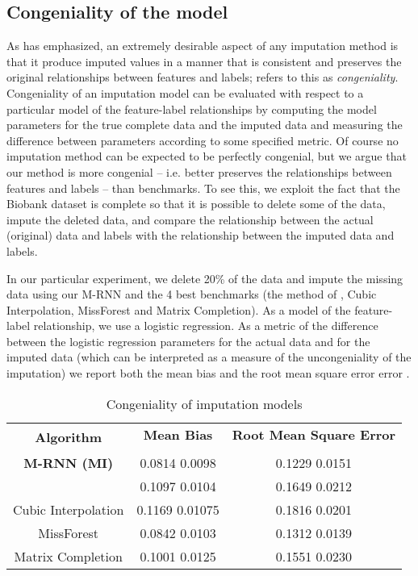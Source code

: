 \documentclass{article}
\begin{document}
\subsection{Congeniality of the model}\label{sect:congenial}
As \cite{congeniality_meng} has emphasized, an extremely desirable aspect of any imputation method is that it produce imputed values in a manner that is consistent and preserves the original relationships between features and labels;  \cite{congeniality_meng}  refers to this as {\em congeniality}.  Congeniality of an imputation model can be evaluated with respect to a particular model of the feature-label relationships by computing the model parameters for the true complete data and the imputed data and measuring the difference between parameters according to some specified metric.  Of course no imputation method can be expected to be perfectly congenial, but we argue that our method is more congenial -- i.e. better preserves the relationships between features and labels -- than benchmarks.  To see this, we exploit the fact that the Biobank dataset is complete so that it is possible to delete some of the data, impute the deleted data, and compare the relationship between the actual (original) data and labels with the relationship between the imputed data and labels.  

In our particular experiment, we delete 20\% of the data and impute the missing data using our M-RNN and the 4 best benchmarks (the method of \cite{Recent_RNN3}, Cubic Interpolation, MissForest and Matrix Completion).  As a model of the feature-label relationship, we use a logistic regression.  As a metric of the difference between the logistic regression parameters  for the actual data and  for the imputed data (which  can be interpreted as a measure of the uncongeniality of the imputation) we report both the mean bias  and  the root mean square error error .  

\begin{table}[h!]
	\caption{Congeniality of imputation models}
	\label{tab:congeniality}
	\centering
	\small
	\begin{tabular}{c|c|c}
		\toprule
		\multirow{2}{*}{\textbf{Algorithm}} & \textbf{Mean Bias} & \textbf{Root Mean Square Error} \\
		&  & \\
		\midrule
		\textbf{M-RNN (MI)} & 0.0814  0.0098 & 0.1229 0.0151  \\
		\midrule
		\cite{Recent_RNN3}   & 0.1097  0.0104 & 0.1649  0.0212 \\
		\midrule
		Cubic Interpolation & 0.1169  0.01075  & 0.1816  0.0201 \\
		\midrule
		MissForest & 0.0842 0.0103 &0.1312  0.0139\\	
		\midrule
		Matrix Completion   & 0.1001  0.0125 & 0.1551  0.0230 \\
		\bottomrule
	\end{tabular}
\end{table}
\end{document}
